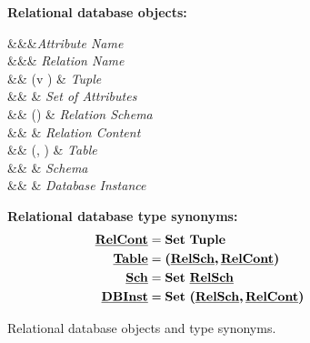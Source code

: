 \begin{figure}

\textbf{Relational database objects:}
\begin{syntax}
\synDef \vAtt \attnametype &&&\textit{Attribute Name}\\
\synDef \vRel \relnametype &&& \textit{Relation Name}\\
\synDef {\underline{\vTuple}} { \tupletype} &\eqq& {(\vi v \numAtts)} & \textit{Tuple}\\
\synDef {\underline{\vAttList}} {\settype \attnametype} &\eqq& 
 & \textit{Set of Attributes}\\
\synDef \pRelSch \pRelSchSet &\eqq& \vRel\left(\underline{\vAttList}\right) & \textit{Relation Schema}\\
\synDef \pRelCont \pRelContSet &\eqq&  & \textit{Relation Content}\\
\synDef \pTab \pTabSet &\eqq& \left(\pRelSch, \pRelCont\right) & \textit{Table}\\
\synDef \pSch \pSchSet  &\eqq& \vSchDef & \textit{Schema}\\
\synDef \pInst \pInstSet &\eqq&  & \textit{Database Instance}\\
\end{syntax}

\medskip
\textbf{Relational database type synonyms:}
\begin{alignat*}{1}
\pRelContSet &= {\settype \tupletype}\\
\pTabSet &= \typepair{\pRelSchSet} {\pRelContSet}\\
\pSchSet &= \settype {\underline \relschtype}\\
{\underline \dbinsttype} &= \settype {\typepair \pRelSchSet {\underline \relconttype}}
\end{alignat*}
\caption[Relational databases definition]{Relational database objects and type synonyms.}
\label{fig:rdb-def}
\end{figure} 

